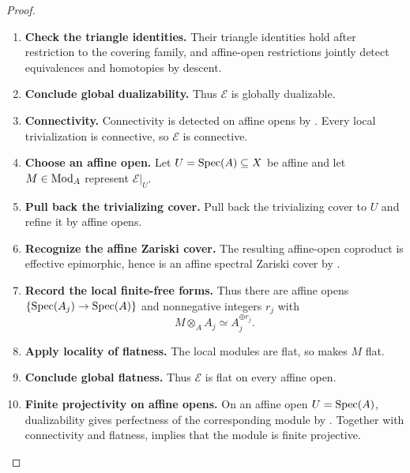 \begin{proof}
\begin{enumerate}[label=\textup{(\arabic*)}]
    \item \textbf{Check the triangle identities.}
    Their triangle identities hold after restriction to the covering family,
    and affine-open restrictions jointly detect equivalences and homotopies by
    descent.

    \item \textbf{Conclude global dualizability.}
    Thus \(\mathcal E\) is globally dualizable.

    \item \textbf{Connectivity.}
    Connectivity is detected on affine opens by
    . Every local trivialization is
    connective, so \(\mathcal E\) is connective.

    \item \textbf{Choose an affine open.}
    Let \(U=\operatorname{Spec}(A)\subseteq X\) be affine and let \(M\in\operatorname{Mod}_A\) represent
    \(\mathcal E|_U\).

    \item \textbf{Pull back the trivializing cover.}
    Pull back the trivializing cover to \(U\) and refine it
    by affine opens.

    \item \textbf{Recognize the affine Zariski cover.}
    The resulting affine-open coproduct is effective
    epimorphic, hence is an affine spectral Zariski cover by
    .

    \item \textbf{Record the local finite-free forms.}
    Thus there are affine opens
    \(\{\operatorname{Spec}(A_j)\to\operatorname{Spec}(A)\}\) and nonnegative integers \(r_j\) with
    \[
        M\otimes_AA_j\simeq A_j^{\oplus r_j}.
    \]

    \item \textbf{Apply locality of flatness.}
    The local modules are flat, so  makes
    \(M\) flat.

    \item \textbf{Conclude global flatness.}
    Thus \(\mathcal E\) is flat on every affine open.

    \item \textbf{Finite projectivity on affine opens.}
    On an affine open \(U=\operatorname{Spec}(A)\), dualizability gives perfectness of the
    corresponding module by . Together
    with connectivity and flatness,
     implies that the module is
    finite projective.
\end{enumerate}
\end{proof}

